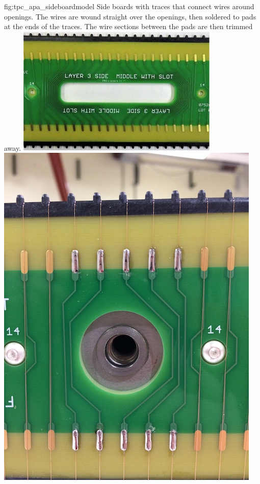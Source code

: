 \begin{dunefigure}{fig:tpc_apa_sideboardmodel}
{Side boards with traces that connect wires around openings.  The wires are wound straight over the openings, then soldered to pads at the ends of the traces. The wire sections between the pads are then trimmed away.}
\includegraphics[height=0.28\textheight]{graphics/sp-apa-side-board-slot.jpg} \quad
\includegraphics[height=0.28\textheight,trim=0mm 0mm 0mm 25mm,clip]{graphics/sp-apa-side-board-round-hole.jpg}
\end{dunefigure}

